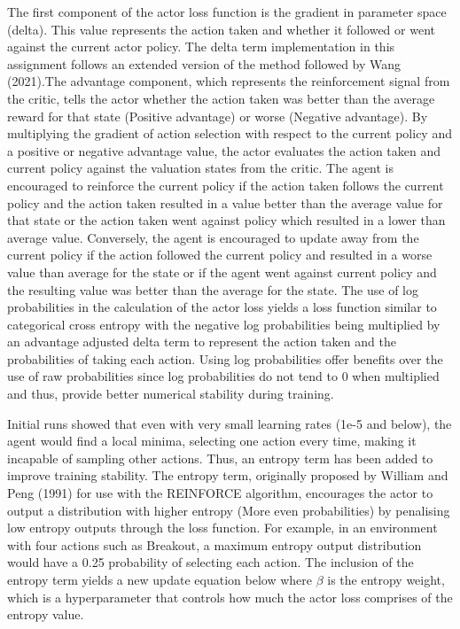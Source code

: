 \documentclass{article}
\begin{document}
The first component of the actor loss function is the gradient in parameter space (delta). This value represents the action taken and whether it followed or went against the current actor policy. The delta term implementation in this assignment follows an extended version of the method followed by Wang (2021).The advantage component, which represents the reinforcement signal from the critic, tells the actor whether the action taken was better than the average reward for that state (Positive advantage) or worse (Negative advantage). By multiplying the gradient of action selection with respect to the current policy and a positive or negative advantage value, the actor evaluates the action taken and current policy against the valuation states from the critic. The agent is encouraged to reinforce the current policy if the action taken follows the current policy and the action taken resulted in a value better than the average value for that state or the action taken went against policy which resulted in a lower than average value. Conversely, the agent is encouraged to update away from the current policy if the action followed the current policy and resulted in a worse value than average for the state or if the agent went against current policy and the resulting value was better than the average for the state. The use of log probabilities in the calculation of the actor loss yields a loss function similar to categorical cross entropy with the negative log probabilities being multiplied by an advantage adjusted delta term to represent the action taken and the probabilities of taking each action. Using log probabilities offer benefits over the use of raw probabilities since log probabilities do not tend to 0 when multiplied and thus, provide better numerical stability during training.

Initial runs showed that even with very small learning rates (1e-5 and below), the agent would find a local minima, selecting one action every time, making it incapable of sampling other actions. Thus, an entropy term has been added to improve training stability. The entropy term, originally proposed by William and Peng (1991) for use with the REINFORCE algorithm, encourages the actor to output a distribution with higher entropy (More even probabilities) by penalising low entropy outputs through the loss function. For example, in an environment with four actions such as Breakout, a maximum entropy output distribution would have a 0.25 probability of selecting each action. The inclusion of the entropy term yields a new update equation below where  $\beta$ is the entropy weight, which is a hyperparameter that controls how much the actor loss comprises of the entropy value.
\end{document}
